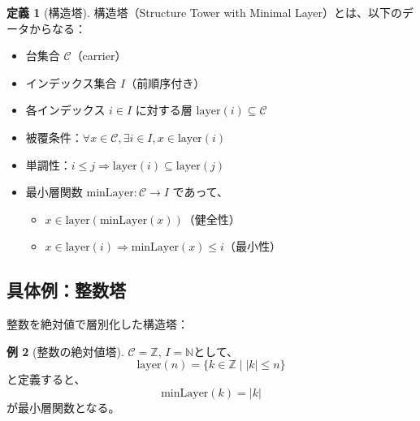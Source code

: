 \documentclass[a4paper,12pt]{ltjsarticle}
\theoremstyle{definition}
\newtheorem{definition}{定義}[section]
\newtheorem{example}[definition]{例}
\begin{document}
\begin{definition}[構造塔]
構造塔（Structure Tower with Minimal Layer）とは、以下のデータからなる：
\begin{itemize}
\item 台集合 $\mathcal{C}$（carrier）
\item インデックス集合 $I$（前順序付き）
\item 各インデックス $i \in I$ に対する層 $\text{layer}(i) \subseteq \mathcal{C}$
\item 被覆条件：$\forall x \in \mathcal{C}, \exists i \in I, x \in \text{layer}(i)$
\item 単調性：$i \leq j \Rightarrow \text{layer}(i) \subseteq \text{layer}(j)$
\item 最小層関数 $\text{minLayer} : \mathcal{C} \to I$ であって、
  \begin{itemize}
  \item $x \in \text{layer}(\text{minLayer}(x))$（健全性）
  \item $x \in \text{layer}(i) \Rightarrow \text{minLayer}(x) \leq i$（最小性）
  \end{itemize}
\end{itemize}
\end{definition}

\subsection{具体例：整数塔}

整数を絶対値で層別化した構造塔：

\begin{example}[整数の絶対値塔]
$\mathcal{C} = \mathbb{Z}$, $I = \mathbb{N}$として、
\[
\text{layer}(n) = \{k \in \mathbb{Z} \mid |k| \leq n\}
\]
と定義すると、
\[
\text{minLayer}(k) = |k|
\]
が最小層関数となる。
\end{example}

\begin{center}
\end{center}
\end{document}
